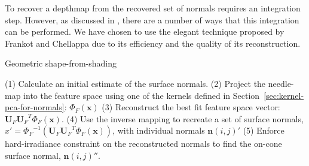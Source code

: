 To recover a depthmap from the recovered set of normals requires an integration step. However, as discussed in \cite{RefWorks:281}, there are a number of ways that this integration can be performed. We have chosen to use the elegant technique proposed by Frankot and Chellappa \cite{RefWorks:99} due to its efficiency and the quality of its reconstruction.

\begin{algorithm}[ht]
    \caption{{\sc Geometric shape-from-shading}}
    \label{alg:gsfs}
        \begin{algorithmic}
            \Statex \hspace{\algorithmicindent} (1) Calculate an initial estimate of the surface normals.
            \Statex \hspace{\algorithmicindent} (2) Project the needle-map into the feature space using one of the kernels defined in Section~\ref{sec:kernel-pca-for-normals}: $\Phi_{F}(\boldsymbol{x})$
            \Statex \hspace{\algorithmicindent} (3) Reconstruct the best fit feature space vector: $\boldsymbol{U}_{F} {\boldsymbol{U}_{F}}^T \Phi_{F}(\boldsymbol{x})$.
            \Statex \hspace{\algorithmicindent} (4) Use the inverse mapping to recreate a set of surface normals, ${x}' = {\Phi_{F}}^{-1} \left( \boldsymbol{U}_{F} {\boldsymbol{U}_{F}}^T \Phi_{F}(\boldsymbol{x}) \right)$, with individual normals ${\boldsymbol{n}(i, j)}'$
            \Statex \hspace{\algorithmicindent} (5) Enforce hard-irradiance constraint on the reconstructed normals to find the on-cone surface normal, ${\boldsymbol{n}(i, j)}''$.
        \end{algorithmic}
\end{algorithm}